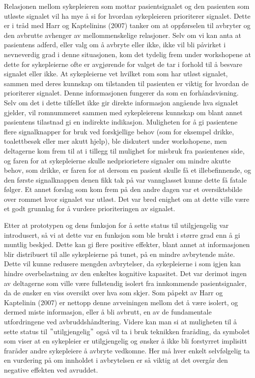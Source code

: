 \noindent
Relasjonen mellom sykepleieren som mottar pasientsignalet og den pasienten som utløste signalet vil ha mye å si for hvordan sykepleieren prioriterer signalet. Dette er i tråd med Harr og Kaptelinins (2007) tanker om at oppførselen til avbryter og den avbrutte avhenger av mellommenskelige relasjoner. Selv om vi kan anta at pasientens adferd, eller valg om å avbryte eller ikke, ikke vil bli påvirket i nevneverdig grad i denne situasjonen, kom det tydelig frem under workshopene at dette for sykepleierne ofte er avgjørende for valget de tar i forhold til å besvare signalet eller ikke. At sykepleierne vet hvilket rom som har utløst signalet, sammen med deres kunnskap om tilstanden til pasienten er viktig for hvordan de prioriterer signalet. Denne informasjonen fungerer da som en forhåndsvisning. Selv om det i dette tilfellet ikke gir direkte informasjon angående hva signalet gjelder, vil romnummeret sammen med sykepleierens kunnskap om blant annet pasientens tilastnad gi en indirekte indikasjon. 
 Muligheten for å gi pasientene flere signalknapper for bruk ved forskjellige behov (som for eksempel drikke, toalettbesøk eller mer akutt hjelp), ble diskutert under workshopene, men deltagerne kom frem til at i tillegg til mulighet for misbruk fra pasientenes side, og faren for at sykepleierne skulle nedpriorietere signaler om mindre akutte behov, som drikke, er faren for at dersom en pasient skulle få et illebefinnende, og den første signalknappen denen fikk tak på var vannglasset kunne dette få fatale følger. Et annet forslag som kom frem på den andre dagen var et oversiktsbilde over rommet hvor signalet var utløst. Det var bred enighet om at dette ville være et godt grunnlag for å vurdere prioriteringen av signalet. 
 
\noindent
Etter at prototypen og dens funksjon for å sette status til utilgjengelig var introdusert, så vi at dette var en funksjon som ble brukt i større grad enn å gi muntlig beskjed. Dette kan gi flere positive effekter, blant annet at informasjonen blir distribuert til alle sykepleierne på tunet, på en mindre avbrytende måte. Dette vil kunne redusere mengden avbrytelser, da sykepleierne i som igjen kan hindre overbelastning av den enkeltes kognitive kapasitet. Det var derimot ingen av deltagerne som ville være fullstendig isolert fra innkommende pasientsignaler, da de ønsker en viss oversikt over hva som skjer. Som påpekt av Harr og Kaptelinin (2007) er nettopp denne avveiningen mellom det å være isolert, og dermed miste informasjon, eller å bli avbrutt, en av de fundamentale utfordringene ved avbruddshåndtering. Videre kan man si at muligheten til å sette status til $"$utilgjengelig$"$ også vil ta i bruk teknikken fraråding, da symbolet som viser at en sykepleier er utilgjengelig og ønsker å ikke bli forstyrret implisitt fraråder andre sykepleiere å avbryte vedkomne. Her må hver enkelt selvfølgelig ta en vurdering på om innholdet i avbrytelsen er så viktig at det overgår den negative effekten ved avruddet. 

